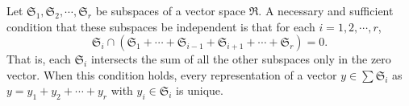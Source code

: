 Let $\mathfrak{S}_1, \mathfrak{S}_2, \cdots, \mathfrak{S}_r$ be subspaces of a vector space $\mathfrak{R}$. A necessary and sufficient condition that these subspaces be independent is that for each $i = 1, 2, \cdots, r$,
$$
\mathfrak{S}_i \cap (\mathfrak{S}_1 + \cdots + \mathfrak{S}_{i-1} + \mathfrak{S}_{i+1} + \cdots + \mathfrak{S}_r) = 0.
$$
That is, each $\mathfrak{S}_i$ intersects the sum of all the other subspaces only in the zero vector. When this condition holds, every representation of a vector $y \in \sum \mathfrak{S}_i$ as $y = y_1 + y_2 + \cdots + y_r$ with $y_i \in \mathfrak{S}_i$ is unique.
